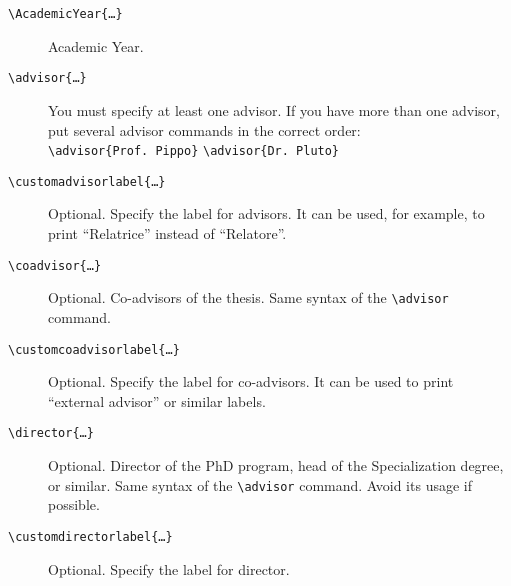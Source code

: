 \documentclass[a5paper,12pt]{article}
\newcommand{\bs}{\textbackslash}
\begin{document}
\begin{description}
\item[\texttt{\bs AcademicYear\{\dots\}}] Academic Year.

\item[\texttt{\bs advisor\{\dots\}}] You must specify at least one advisor.
If you have more than one advisor, put several advisor commands in the correct order:\\
\texttt{\bs advisor\{Prof.~Pippo\}} \texttt{\bs advisor\{Dr.~Pluto\}}

\item[\texttt{\bs customadvisorlabel\{\dots\}}] Optional. Specify the label for advisors. It can be used, for example, to print ``Relatrice'' instead of ``Relatore''.

\item[\texttt{\bs coadvisor\{\dots\}}] Optional. Co-advisors of the thesis. 
Same syntax of the \texttt{\bs advisor} command.

\item[\texttt{\bs customcoadvisorlabel\{\dots\}}] Optional. Specify the label for co-advisors. It can be used to print ``external advisor'' or similar labels.

\item[\texttt{\bs director\{\dots\}}] Optional. Director of the PhD program, head of the Specialization degree, or similar. Same syntax of the \texttt{\bs advisor} command. Avoid its usage if possible.

\item[\texttt{\bs customdirectorlabel\{\dots\}}] Optional. Specify the label for director.

\end{description}
\end{document}
